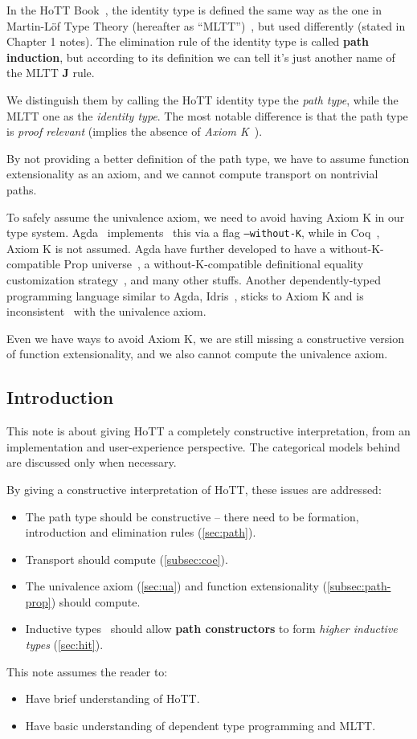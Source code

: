 In the HoTT Book~\cite{hottbook},
the identity type is defined the same way as the one
in Martin-L\"{o}f Type Theory (hereafter as ``MLTT'')~\cite{MLTT},
but used differently (stated in Chapter 1 notes).
The elimination rule of the identity type is called \textbf{path induction},
but according to its definition we can tell
it's just another name of the MLTT \textbf J rule.

We distinguish them by calling the HoTT identity type the \textit{path type},
while the MLTT one as the \textit{identity type}.
The most notable difference is that the path type is
\textit{proof relevant} (implies the absence of
\textit{Axiom K}~\cite{AxiomK}).

By not providing a better definition of the path type,
we have to assume function extensionality as an axiom,
and we cannot compute transport on nontrivial paths.

To safely assume the univalence axiom, we need to avoid having Axiom K
in our type system.
Agda~\cite{Agda} implements~\cite{WithoutK} this via a flag \texttt{--without-K},
while in Coq~\cite{Coq}, Axiom K is not assumed.
Agda have further developed to have a without-K-compatible \textsf{Prop}
universe~\cite{PropWithoutK}, a without-K-compatible definitional equality
customization strategy~\cite{RewriteWithoutK}, and many other stuffs.
Another dependently-typed programming language similar to Agda,
Idris~\cite{Idris}, sticks to Axiom K and is
inconsistent~\cite{IdrisHoTT} with the univalence axiom.

Even we have ways to avoid Axiom K,
we are still missing a constructive version of function extensionality,
and we also cannot compute the univalence axiom.

\subsection{Introduction}
\label{subsec:introduction}

This note is about giving HoTT a completely constructive interpretation,
from an implementation and user-experience perspective.
The categorical models behind are discussed only when necessary.

By giving a constructive interpretation of HoTT,
these issues are addressed:

\begin{itemize}
\item The path type should be constructive --
  there need to be formation, introduction and
  elimination rules (\cref{sec:path}).
\item Transport should compute (\cref{subsec:coe}).
\item The univalence axiom (\cref{sec:ua}) and function extensionality
  (\cref{subsec:path-prop}) should compute.
\item Inductive types~\cite{Inductive} should allow \textbf{path constructors}
  to form \textit{higher inductive types} (\cref{sec:hit}).
\end{itemize}

This note assumes the reader to:

\begin{itemize}
\item Have brief understanding of HoTT.
\item Have basic understanding of dependent type programming and MLTT.
\end{itemize}